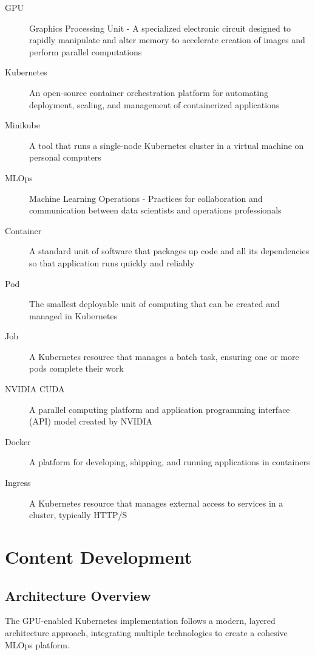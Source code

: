 \documentclass[12pt,a4paper]{report}
\begin{document}
\begin{description}
    \item[GPU] Graphics Processing Unit - A specialized electronic circuit designed to rapidly manipulate and alter memory to accelerate creation of images and perform parallel computations
    \item[Kubernetes] An open-source container orchestration platform for automating deployment, scaling, and management of containerized applications
    \item[Minikube] A tool that runs a single-node Kubernetes cluster in a virtual machine on personal computers
    \item[MLOps] Machine Learning Operations - Practices for collaboration and communication between data scientists and operations professionals
    \item[Container] A standard unit of software that packages up code and all its dependencies so that application runs quickly and reliably
    \item[Pod] The smallest deployable unit of computing that can be created and managed in Kubernetes
    \item[Job] A Kubernetes resource that manages a batch task, ensuring one or more pods complete their work
    \item[NVIDIA CUDA] A parallel computing platform and application programming interface (API) model created by NVIDIA
    \item[Docker] A platform for developing, shipping, and running applications in containers
    \item[Ingress] A Kubernetes resource that manages external access to services in a cluster, typically HTTP/S
\end{description}

\chapter{Content Development}
\label{chap:content-development}

\section{Architecture Overview}
The GPU-enabled Kubernetes implementation follows a modern, layered architecture approach, integrating multiple technologies to create a cohesive MLOps platform.
\end{document}
